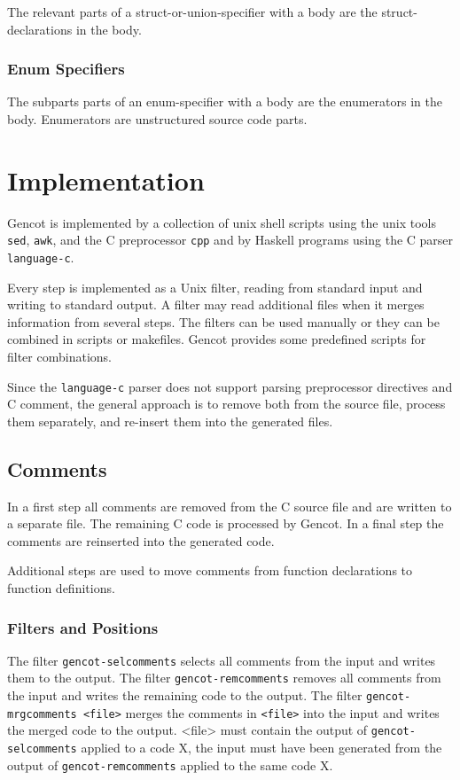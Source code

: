 \documentclass[a4paper]{report}
\newcommand{\code}[1]{\textnormal{\texttt{#1}}}
\begin{document}
The relevant parts 
of a struct-or-union-specifier with a body are the struct-declarations in the body. 

\subsection{Enum Specifiers}

The subparts parts of an enum-specifier
with a body are the enumerators in the body. Enumerators are unstructured source code parts. 

\chapter{Implementation}

Gencot is implemented by a collection of unix shell scripts using the unix tools \code{sed}, \code{awk}, and the 
C preprocessor \code{cpp} and by Haskell programs using the C parser \code{language-c}. 

Every step is implemented as a Unix filter, reading from standard input and writing to standard output. A filter
may read additional files when it merges information from several steps. The filters
can be used manually or they can be combined in scripts or makefiles. Gencot provides some predefined scripts
for filter combinations.

Since the \code{language-c} parser does not support parsing preprocessor directives and C comment, the general approach
is to remove both from the source file, process them separately, and re-insert them into the generated files.

\section{Comments}

In a first step all comments are removed from the C source file and are written to a separate file. The remaining 
C code is processed by Gencot. In a final step the comments are reinserted into the generated code.

Additional steps are used to move comments from function declarations to function definitions.

\subsection{Filters and Positions}

The filter \code{gencot-selcomments} selects all comments from the input and writes them to the output.
The filter \code{gencot-remcomments} removes all comments from the input and writes the remaining code to the output.
The filter \code{gencot-mrgcomments <file>} merges the comments in \code{<file>} into the input and writes the
merged code to the output. <file> must contain the output of \code{gencot-selcomments} applied to a code X, the 
input must have been generated from the output of \code{gencot-remcomments} applied to the same code X.
\end{document}
